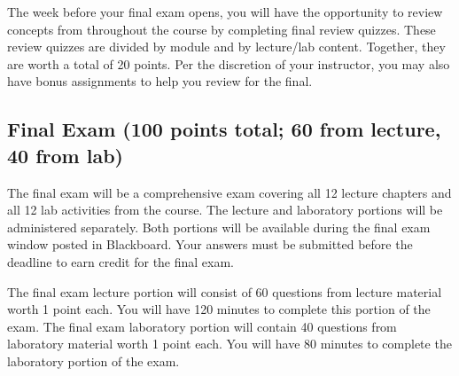 The week before your final exam opens, you will have the opportunity to review concepts from throughout the course by completing final review quizzes. These review quizzes are divided by module and by lecture/lab content. Together, they are worth a total of 20 points. Per the discretion of your instructor, you may also have bonus assignments to help you review for the final.

\subsection*{Final Exam (100 points total; 60 from lecture, 40 from lab)}

The final exam will be a comprehensive exam covering all 12 lecture chapters and all 12 lab activities from the course. The lecture and laboratory portions will be administered separately. Both portions will be available during the final exam window posted in Blackboard. Your answers must be submitted before the deadline to earn credit for the final exam.

The final exam lecture portion will consist of 60 questions from lecture material worth 1 point each. You will have 120 minutes to complete this portion of the exam. The final exam laboratory portion will contain 40 questions from laboratory material worth 1 point each. You will have 80 minutes to complete the laboratory portion of the exam.